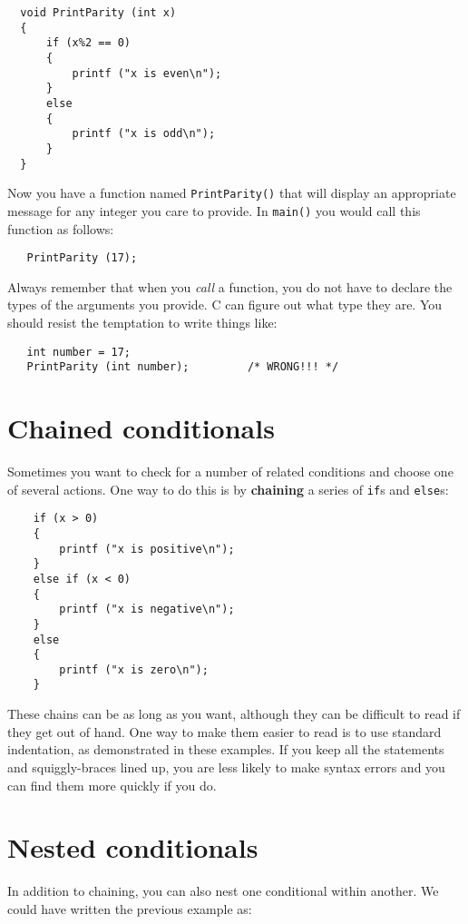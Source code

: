 \begin{verbatim}
  void PrintParity (int x) 
  {
      if (x%2 == 0) 
      {
          printf ("x is even\n");
      } 
      else 
      {
          printf ("x is odd\n");
      }
  }
\end{verbatim}
%
Now you have a function named {\tt PrintParity()} that will display
an appropriate message for any integer you care to provide.
In {\tt main()} you would call this function as follows:

\begin{verbatim}
   PrintParity (17);
\end{verbatim}
%
Always remember that when you {\em call} a function, you do
not have to declare the types of the arguments you provide.
C can figure out what type they are.  You should resist the
temptation to write things like:

\begin{verbatim}
   int number = 17;
   PrintParity (int number);         /* WRONG!!! */
\end{verbatim}

\section {Chained conditionals}

Sometimes you want to check for a number of related conditions
and choose one of several actions.  One way to do this is by
{\bf chaining} a series of {\tt if}s and {\tt else}s:

\begin{verbatim}
    if (x > 0) 
    {
        printf ("x is positive\n");
    } 
    else if (x < 0) 
    {
        printf ("x is negative\n");
    } 
    else 
    {
        printf ("x is zero\n");
    }
\end{verbatim}
%
These chains can be as long as you want, although they can
be difficult to read if they get out of hand.  One way to
make them easier to read is to use standard indentation,
as demonstrated in these examples.  If you keep all the
statements and squiggly-braces lined up, you are less
likely to make syntax errors and you can find them more
quickly if you do.

\section{Nested conditionals}

In addition to chaining, you can also nest one conditional
within another.  We could have written the previous example
as:

